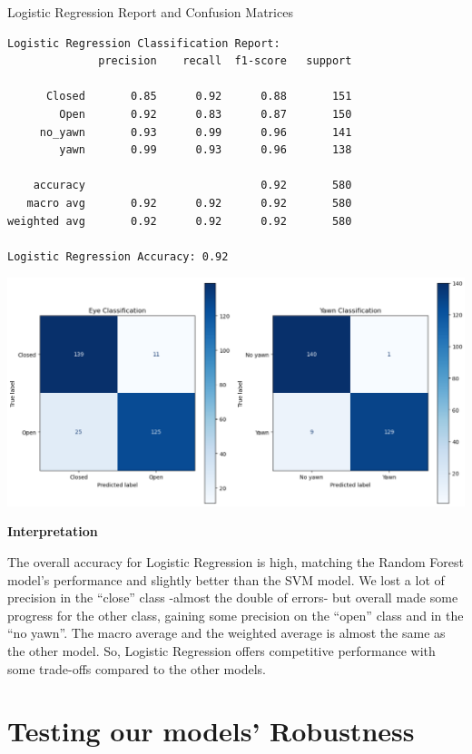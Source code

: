 \documentclass{modeleRapport}
\begin{document}
\begin{codebox}[OutputE]{ Logistic Regression Report and Confusion Matrices}
\begin{verbatim}
Logistic Regression Classification Report:
              precision    recall  f1-score   support

      Closed       0.85      0.92      0.88       151
        Open       0.92      0.83      0.87       150
     no_yawn       0.93      0.99      0.96       141
        yawn       0.99      0.93      0.96       138

    accuracy                           0.92       580
   macro avg       0.92      0.92      0.92       580
weighted avg       0.92      0.92      0.92       580

Logistic Regression Accuracy: 0.92
\end{verbatim}

\includegraphics[width=15cm]{Images/LR_cm.png}

\end{codebox}

\textbf{Interpretation\\}

The overall accuracy for Logistic Regression is high, matching the Random Forest model's performance and slightly better than the SVM model. We lost a lot of precision in the “close” class -almost the double of errors- but overall made some progress for the other class, gaining some precision on the “open” class and in the “no yawn”. The macro average and the weighted average is almost the same as the other model.
So, Logistic Regression offers competitive performance with some trade-offs compared to the other models.

\newpage

\section{Testing our models' Robustness}
\end{document}
